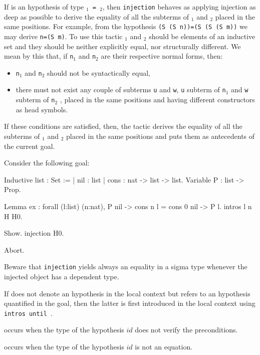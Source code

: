If {\ident} is an hypothesis of type {\tt {\term$_1$} = {\term$_2$}},
then {\tt injection} behaves as applying injection as deep as possible to
derive the equality of all the subterms of {\term$_1$} and {\term$_2$}
placed in the same positions. For example, from the hypothesis {\tt (S
  (S n))=(S (S (S m))} we may derive {\tt n=(S m)}.  To use this
tactic {\term$_1$} and {\term$_2$} should be elements of an inductive
set and they should be neither explicitly equal, nor structurally
different. We mean by this that, if {\tt n$_1$} and {\tt n$_2$} are
their respective normal forms, then:
\begin{itemize}
\item {\tt n$_1$} and {\tt n$_2$} should not be syntactically equal,
\item there must not exist any couple of subterms {\tt u} and {\tt w},
  {\tt u} subterm of {\tt n$_1$} and {\tt w} subterm of {\tt n$_2$} ,
  placed in the same positions and having different constructors as
  head symbols.
\end{itemize}
If these conditions are satisfied, then, the tactic derives the
equality of all the subterms of {\term$_1$} and {\term$_2$} placed in
the same positions and puts them as antecedents of the current goal.

\Example Consider the following goal:

\begin{coq_example*}
Inductive list : Set :=
  | nil : list
  | cons : nat -> list -> list.
Variable P : list -> Prop.
\end{coq_example*}
\begin{coq_eval}
Lemma ex :
 forall (l:list) (n:nat), P nil -> cons n l = cons 0 nil -> P l.
intros l n H H0.
\end{coq_eval}
\begin{coq_example}
Show.
injection H0.
\end{coq_example}
\begin{coq_eval}
Abort.
\end{coq_eval}

Beware that \texttt{injection} yields always an equality in a sigma type
whenever the injected object has a dependent type.

\Rem If {\ident} does not denote an hypothesis in the local context
but refers to an hypothesis quantified in the goal, then the
latter is first introduced in the local context using
\texttt{intros until \ident}.

\begin{ErrMsgs}
\item {\ident}  
  occurs when the type of
  the hypothesis $id$ does not verify the preconditions.
\item {} occurs when the type of the
  hypothesis $id$ is not an equation.
\end{ErrMsgs}

